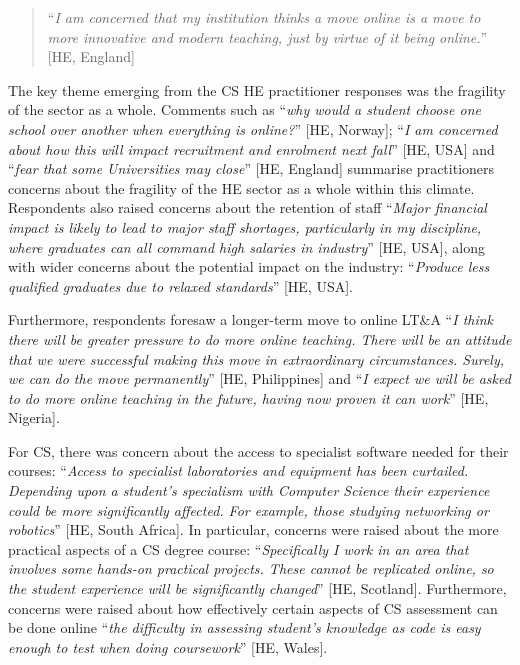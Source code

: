 \documentclass[conference]{IEEEtran}
\begin{document}
\begin{quotation}
``{\emph{I am concerned that my institution thinks a move online is a
move to more innovative and modern teaching, just by virtue of it
being online.}}'' [HE, England]
\end{quotation}

The key theme emerging from the CS HE practitioner responses was the
fragility of the sector as a whole. Comments such as ``{\emph{why
would a student choose one school over another when everything is
online?}}'' [HE, Norway]; ``{\emph{I am concerned about how this will
impact recruitment and enrolment next fall}}'' [HE, USA] and ``{\emph{fear
that some Universities may close}}'' [HE, England] summarise practitioners
concerns about the fragility of the HE sector as a whole within this
climate. Respondents also raised
concerns about the retention of staff ``{\emph{Major financial impact
is likely to lead to major staff shortages, particularly in my
discipline, where graduates can all command high salaries in
industry}}'' [HE, USA], along with wider concerns about the potential
impact on the industry: ``{\emph{Produce less qualified graduates due
    to relaxed standards}}'' [HE, USA].

Furthermore, respondents foresaw a longer-term move to online LT\&A
``{\emph{I think there will be greater pressure to do more online
teaching. There will be an attitude that we were successful making
this move in extraordinary circumstances. Surely, we can do the move
permanently}}'' [HE, Philippines] and ``{\emph{I expect we will be asked
to do more online teaching in the future, having now proven it can
work}}'' [HE, Nigeria].

For CS, there was concern about the access
to specialist software needed for their courses: ``{\emph{Access to
specialist laboratories and equipment has been curtailed. Depending
upon a student’s specialism with Computer Science their experience
could be more significantly affected. For example, those studying
networking or robotics}}'' [HE, South Africa]. In particular, concerns
were raised about the more practical aspects of a CS degree course:
``{\emph{Specifically I work in an area that involves some hands-on
practical projects. These cannot be replicated online, so the student
experience will be significantly changed}}'' [HE, Scotland]. Furthermore,
concerns were raised about how effectively certain aspects of CS
assessment can be done online ``{\emph{the difficulty in
assessing student's knowledge as code is easy enough to test when
doing coursework}}'' [HE, Wales].
\end{document}
